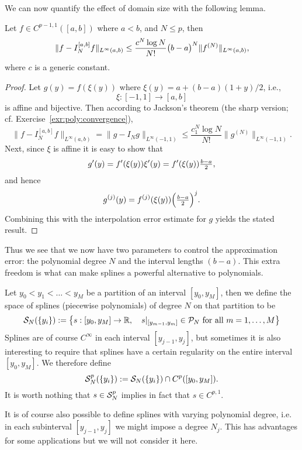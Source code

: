 We can now quantify the effect of domain size with the following lemma. 

\begin{lemma}
    Let $f \in C^{p-1,1}([a,b])$ where $a < b$, and $N \leq p$, then 
    \[
        \|f - I_N^{[a,b]} f \|_{L^\infty(a,b)} 
        \leq \frac{c^N \log N}{N!} \big(b-a\big)^N \| f^{(N)} \|_{L^\infty(a,b)},
    \]
    where $c$ is a generic constant.
\end{lemma}
\begin{proof}
    Let $g(y) = f(\xi(y))$ where $\xi(y) = a + (b-a)(1+y)/2$, i.e., 
    \[ 
        \xi : [-1,1] \to [a, b]
    \]
    is affine and bijective. Then according to Jackson's theorem (the sharp
    version; cf. Exercise~\ref{exr:poly:convergence}), 
    \[
        \|f - I_N^{[a,b]} f\|_{L^\infty(a,b)} = 
        \| g - I_N g \|_{L^\infty(-1,1)}  
        \leq  \frac{c_1^N\log N}{N!} \| g^{(N)} \|_{L^\infty(-1,1)}.
    \]
    Next, since $\xi$ is affine it is easy to show that 
    \[
        g'(y) = f'(\xi(y)) \xi'(y) = f'(\xi(y)) {\textstyle \frac{b-a}{2}},
    \]
    and hence 
    \[
        g^{(j)}(y) = f^{(j)}(\xi(y)) \Big({\textstyle \frac{b-a}{2}}\Big)^j.
    \]
    Combining this with the interpolation error estimate for $g$ 
    yields the stated result.
\end{proof}

Thus we see that we now have two parameters to control the approximation error:
the polynomial degree $N$ and the interval lengths $(b-a)$. This extra freedom
is what can make splines a powerful alternative to polynomials. 


\begin{definition}
    Let $y_0 < y_1 < \dots < y_M$ be a partition of an interval $[y_0, y_M]$,
    then we define the space of splines (piecewise polynomials) of degree $N$ on
    that partition to be 
    \[
        \mathcal{S}_N(\{y_i\}) := \big\{ s : [y_0, y_M] \to \mathbb{R}, \quad 
            s|_{[y_{m-1}, y_m]} \in \mathcal{P}_N \text{ for all }
            m = 1, \dots, M \big\}
    \]
    Splines are of course $C^\infty$ in each interval $[y_{j-1}, y_j]$, but 
    sometimes it is also interesting to require that splines have a certain 
    regularity on the entire interval $[y_0, y_M]$. We therefore define 
    \[
        \mathcal{S}_N^p(\{y_i\}) := \mathcal{S}_N(\{y_i\}) \cap C^p([y_0, y_M]).
    \]
    It is worth nothing that $s \in \mathcal{S}_N^p$ implies in fact that $s \in
    C^{p,1}$.
\end{definition}

\begin{remark}
    It is of course also possible to define splines with varying polynomial
    degree, i.e. in each subinterval $[y_{j-1}, y_j]$ we might impose a degree
    $N_j$. This has advantages for some applications but we will not consider it
    here. 
\end{remark}

